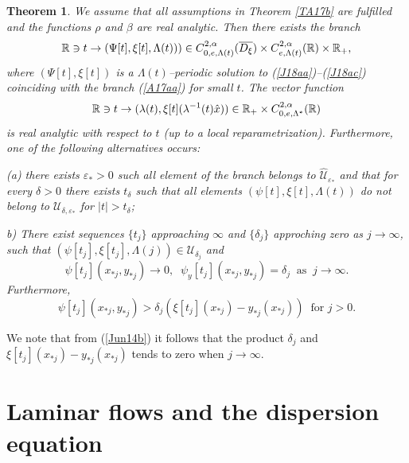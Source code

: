\documentclass[a4paper,reqno,12pt]{amsart}
\theoremstyle{plain}
\newtheorem{theorem}{Theorem}[section]
\theoremstyle{definition}
\numberwithin{equation}{section}
\begin{document}
\begin{theorem}\label{TMa2a} We assume that all assumptions in Theorem \ref{TA17b} are fulfilled and the functions $\rho$ and $\beta$ are real analytic. Then there exists the branch
\begin{equation}\label{Ma2a}
\Bbb R\ni t\rightarrow (\Psi[t],\xi[t],\Lambda(t)))\in C^{2,\alpha}_{0,e,\Lambda(t)}(\overline{D_\xi})\times C^{2,\alpha}_{e,\Lambda(t)}(\Bbb R)\times\Bbb R_+,
\end{equation}
where $(\Psi[t],\xi[t])$ is a $\Lambda(t)$--periodic solution to (\ref{J18aa})--(\ref{J18ac}) coinciding with the branch (\ref{A17aa}) for small $t$. The vector function
\begin{equation}\label{Ma2aa}
\Bbb R\ni t\rightarrow (\lambda(t),\xi[t](\lambda^{-1}(t)\hat{x}))\in \Bbb R_+\times C^{2,\alpha}_{0,e,\Lambda^*}(\Bbb R)
\end{equation}
is real analytic with respect to $t$ (up to a local reparametrization). Furthermore, one of the following alternatives occurs:



(a) there exists $\varepsilon_*>0$  such all element of the branch belongs to $\widehat{\mathcal U}_{\varepsilon_*}$ and that for every $\delta>0$ there exists
$t_\delta$ such that all elements  $(\psi[t],\xi[t],\Lambda(t))$  do not belong to ${\mathcal U}_{\delta,\varepsilon_*}$ for $|t|>t_\delta$;



b) There exist  sequences $\{t_j\}$ approaching $\infty$  and $\{\delta_j\}$ approching zero as $j\to\infty$, such that
$(\psi[t_j],\xi[t_j],\Lambda(j))\in {\mathcal U}_{\delta_j}$ and
\begin{equation}\label{Jun7b}
 \psi[t_j](x_{*j},y_{*j})\to 0, \;\; \psi_y[t_j](x_{*j},y_{*j})=\delta_j \;\;\mbox{as}\;\;j\to\infty.
\end{equation}
Furthermore,
\begin{equation}\label{Jun14b}
\psi[t_j](x_{*j},y_{*j})>\delta_j(\xi[t_j](x_{*j})-y_{*j}(x_{*j}))\;\;\mbox{for $j>0$}.
\end{equation}


\end{theorem}

We note that from (\ref{Jun14b}) it follows that the product $\delta_j$ and $\xi[t_j](x_{*j})-y_{*j}(x_{*j})$ tends to zero when $j\to\infty$.


\section{Laminar flows and the dispersion equation}
\end{document}
